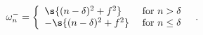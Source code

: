 \begin{equation}
\omega^-_{n} = \left\{ \begin{array}{ll} 
\s{(n - \delta)^2+f^2} & \mbox{ for } n > \delta \\
-\s{(n - \delta)^2+f^2} & \mbox{ for } n \leq \delta 
\end{array} \right.\ \ .
\end{equation}

